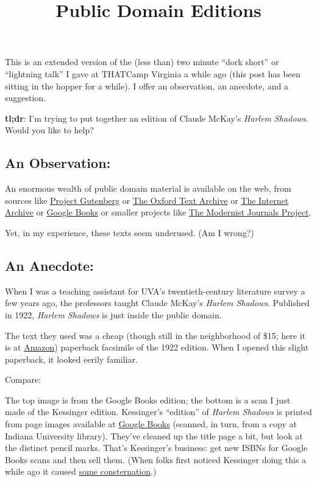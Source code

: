 \documentclass[
  12pt,
]{article}
\title{Public Domain Editions}
\author{}
\date{}
\begin{document}
This is an extended version of the (less than) two minute ``dork short''
or ``lightning talk'' I gave at THATCamp Virginia a while ago (this post
has been sitting in the hopper for a while). I offer an observation, an
anecdote, and a suggestion.

\textbf{tl;dr}: I'm trying to put together an edition of Claude McKay's
\emph{Harlem Shadows.} Would you like to help?

\hypertarget{an-observation}{%
\subsection{An Observation:}\label{an-observation}}

An enormous wealth of public domain material is available on the web,
from sources like \href{http://gutenberg.org}{Project Gutenberg} or
\href{http://ota.ahds.ac.uk/}{The Oxford Text Archive} or
\href{http://archive.org}{The Internet Archive} or
\href{http://books.google.com}{Google Books} or smaller projects like
\href{http://dl.lib.brown.edu/mjp/}{The Modernist Journals Project}.

Yet, in my experience, these texts seem underused. (Am I wrong?)

\hypertarget{an-anecdote}{%
\subsection{An Anecdote:}\label{an-anecdote}}

When I was a teaching assistant for UVA's twentieth-century literature
survey a few years ago, the professors taught Claude McKay's
\emph{Harlem Shadows}. Published in 1922, \emph{Harlem Shadows} is just
inside the public domain.

The text they used was a cheap (though still in the neighborhood of
\$15; here it is at
\href{http://www.amazon.com/Harlem-Shadows-Poems-Claude-Mckay/dp/1120198720/}{Amazon})
paperback facsimile of the 1922 edition. When I opened this slight
paperback, it looked eerily familiar.

Compare:

The top image is from the Google Books edition; the bottom is a scan I
just made of the Kessinger edition. Kessinger's ``edition'' of
\emph{Harlem Shadows} is printed from page images available at
\href{http://books.google.com/books?id=aKTPAAAAMAAJ}{Google Books}
(scanned, in turn, from a copy at Indiana University library). They've
cleaned up the title page a bit, but look at the distinct pencil marks.
That's Kessinger's business: get new ISBNs for Google Books scans and
then sell them. (When folks first noticed Kessinger doing this a while
ago it caused
\href{http://productforums.google.com/forum/\#!category-topic/books/google-books-searching-and-discovering/4b8Bj0HTtxE}{some
consternation}.)
\end{document}

